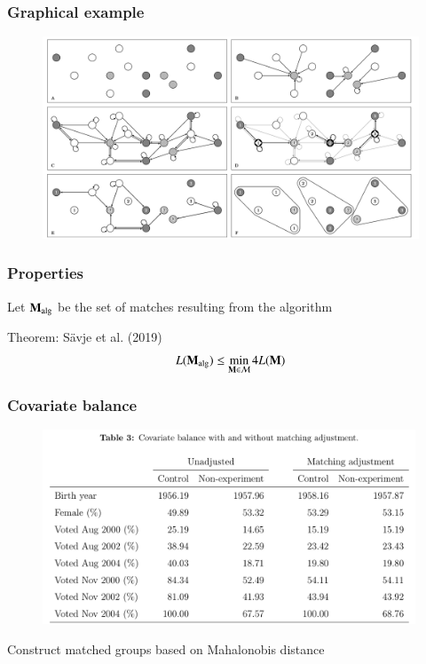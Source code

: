 
\begin{frame}
  \frametitle{Graphical example}
  
  \begin{figure}[ht]
    \centering
    \includegraphics[width=\textwidth]{figures/saevje-network.png}
  \end{figure}

  
\end{frame}


\begin{frame}
  \frametitle{Properties}

  Let $\mathbf{M}_{\text{alg}}$ be the set of matches resulting from the algorithm

  \begin{block}{Theorem: S\"avje et al. (2019)}
    $$L(\mathbf{M}_\text{alg}) \leq \min_{\mathbf{M} \in \mathcal{M}} 4 L(\mathbf{M})$$
  \end{block}
  
\end{frame}


\begin{frame}
  \frametitle{Covariate balance}
  
  \begin{figure}[ht]    
    \centering
    \includegraphics[width=0.99\textwidth]{figures/saevje-table3.png}
  \end{figure}

  Construct matched groups based on Mahalonobis distance
  
\end{frame}

